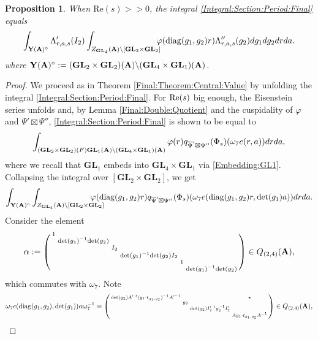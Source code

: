 \documentclass[11pt, reqno]{amsart}
\theoremstyle{plain}
\newtheorem{proposition}[theorem]{Proposition}
\theoremstyle{definition}
\theoremstyle{remark}
\theoremstyle{plain}
\def\A{{\bf A}}
\def\det{\mathrm{det}}
\def\GL{\mathbf{GL}}
\begin{document}
\begin{proposition}\label{Unfolding:Spherical:Period} When $\mathrm{Re}(s)>>0$, the integral \eqref{Integral:Section:Period:Final} equals 
      \begin{align*}
        \int_{ \mathbf{Y}(\A)^\circ } \Lambda_{r,a,s}'(I_2)\int_{Z_{\GL_4}(\A)\backslash [\GL_2\times \GL_2]} \!\!\!\!\varphi({\rm diag}(g_1,g_2) r) \Lambda''_{r,a,s}(g_2) dg_1dg_2drda.  
             \end{align*}
   where  $\mathbf{Y}(\A)^\circ :=  (\GL_2 \times \GL_2)(\A) \backslash (\GL_4 \times \GL_1)(\A)$.
\end{proposition}
\begin{proof}
    We proceed as in Theorem \ref{Final:Theorem:Central:Value} by unfolding the integral \eqref{Integral:Section:Period:Final}. For ${\rm Re}(s)$ big enough, the Eisenstein series unfolds and, by Lemma \ref{Final:Double:Quotient} and the cuspidality of $\varphi$ and $\Psi'\boxtimes\Psi''$, \eqref{Integral:Section:Period:Final} is shown to be equal to    \begin{equation}\label{First:Eq:Prop:Final:Unfolding}\int_{ (\GL_2 \times \GL_2)(F) \GL_1(\A) \backslash (\GL_4 \times \GL_1)(\A)}\varphi(r) q_{\overline{\Psi}'\boxtimes\Psi''}(\Phi_{s})(\omega_7 e(r,a)) drda,\end{equation}  
    where we recall that $\GL_1$ embeds into $\GL_4\times \GL_1$ via \eqref{Embedding:GL1}. Collapsing the integral over $[\GL_2 \times \GL_2]$, we get 
\begin{equation}\label{Second:Eq:Prop:Final:Unfolding}\int_{ \mathbf{Y}(\A)^\circ } \int_{Z_{\GL_4}(\A)\backslash [\GL_2\times \GL_2]} \!\!\!\!\!\!\!\!\!\!\! \varphi({\rm diag}(g_1,g_2)r) q_{\overline{\Psi}'\boxtimes\Psi''}(\Phi_{s})(\omega_7 e({\rm diag}(g_1,g_2) r,\det(g_1) a)) drda.\end{equation} 
    Consider the element
    \[\alpha := \left(\begin{smallmatrix}1& & & & &\\ &\mathrm{det}(g_1)^{-1}\mathrm{det}(g_2)& & & & \\ & & I_2& & &\\  & & &\mathrm{det}(g_1)^{-1}\mathrm{det}(g_2)I_2 & & \\   & & & &1 & \\   & & & & &\mathrm{det}(g_1)^{-1}\mathrm{det}(g_2)\end{smallmatrix}\right)\in  Q_{(2,4)}(\A),\]
which commutes with $\omega_7$. Note
    \[\omega_7 e(\mathrm{diag}(g_1,g_2),\mathrm{det}(g_1)) \alpha \omega_7^{-1} = \left(\begin{smallmatrix}\mathrm{det}(g_2)A'\;^t( g_1 \cdot t_{g_1,g_2} )^{-1}A'^{-1}  & & & \star\\ &g_2& & \\ & &\mathrm{det}(g_2)I_2'\;^tg_2^{-1}I_2'& \\ & & &A g_1 \cdot t_{g_1,g_2} A^{-1}\end{smallmatrix}\right)\in Q_{(2,4)}(\A),\]

\end{proof}
\end{document}
